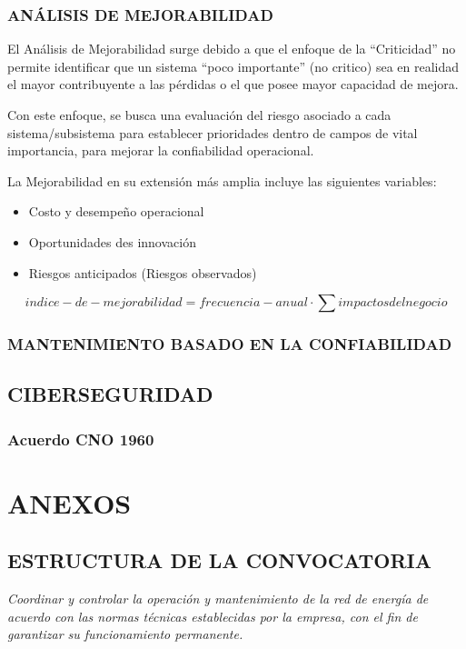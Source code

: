 \documentclass[a5paper]{book}%
\begin{document}
  \section{ANÁLISIS DE MEJORABILIDAD}

  El Análisis de Mejorabilidad surge debido a que el enfoque de la “Criticidad” no permite identificar que un sistema “poco importante” (no critico) sea en realidad el mayor contribuyente a las pérdidas o el que posee mayor capacidad de mejora.

Con este enfoque, se busca una evaluación del riesgo asociado a cada sistema/subsistema para establecer prioridades dentro de campos de vital importancia, para mejorar la confiabilidad operacional.

La Mejorabilidad en su extensión más amplia incluye las siguientes variables:

\begin{itemize}
\item Costo y desempeño operacional
\item Oportunidades des innovación
\item Riesgos anticipados (Riesgos observados)
\end{itemize}

\[ indice-de-mejorabilidad = frecuencia-anual \cdot \sum impactos del negocio\]


\section{MANTENIMIENTO BASADO EN LA CONFIABILIDAD}


\chapter{CIBERSEGURIDAD}

\section{Acuerdo CNO 1960}

\part{ANEXOS}

\chapter*{ESTRUCTURA DE LA CONVOCATORIA}

\textit{Coordinar y controlar la operación y mantenimiento de la red de energía de acuerdo con las normas
	técnicas establecidas por la empresa, con el fin de garantizar su funcionamiento permanente.
}
\end{document}
